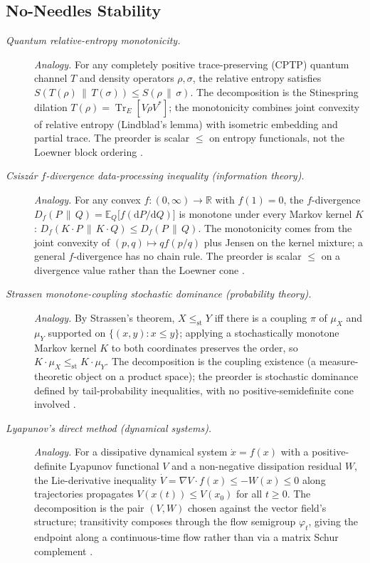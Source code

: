 \subsection*{ No-Needles Stability}
\begingroup\small
\begin{description}
\item[\emph{Quantum relative-entropy monotonicity.}] \textit{Analogy.}
For any completely positive trace-preserving (CPTP) quantum channel
\(T\) and density operators \(\rho,\sigma\), the relative entropy
satisfies \(S(T(\rho)\,\|\,T(\sigma))\le S(\rho\,\|\,\sigma)\).  The
decomposition is the Stinespring dilation
\(T(\rho)=\operatorname{Tr}_E[V\rho V^{*}]\); the monotonicity
combines joint convexity of relative entropy (Lindblad's lemma) with
isometric embedding and partial trace.  The preorder is scalar
\(\le\) on entropy functionals, not the Loewner block ordering
\citep{Lindblad1975CompletelyPositiveMaps}.

\item[\emph{Csiszár \(f\)-divergence data-processing inequality
(information theory).}] \textit{Analogy.}
For any convex \(f:(0,\infty)\to\mathbb R\) with \(f(1)=0\), the
\(f\)-divergence
\(D_f(P\,\|\,Q)=\mathbb E_Q\!\bigl[f(\mathrm dP/\mathrm dQ)\bigr]\) is
monotone under every Markov kernel \(K\):
\(D_f(K\!\cdot\!P\,\|\,K\!\cdot\!Q)\le D_f(P\,\|\,Q)\).  The
monotonicity comes from the joint convexity of
\((p,q)\mapsto qf(p/q)\) plus Jensen on the kernel mixture; a general
\(f\)-divergence has no chain rule.  The preorder is scalar \(\le\) on a
divergence value rather than the Loewner cone
\citep{LieseVajda2006Divergences}.

\item[\emph{Strassen monotone-coupling stochastic dominance
(probability theory).}] \textit{Analogy.}
By Strassen's theorem, \(X\le_{\mathrm{st}}Y\) iff there is a
coupling \(\pi\) of \(\mu_X\) and \(\mu_Y\) supported on
\(\{(x,y):x\le y\}\); applying a stochastically monotone Markov
kernel \(K\) to both coordinates preserves the order, so
\(K\!\cdot\!\mu_X\le_{\mathrm{st}}K\!\cdot\!\mu_Y\).  The
decomposition is the coupling existence (a measure-theoretic object
on a product space); the preorder is stochastic dominance defined by
tail-probability inequalities, with no positive-semidefinite cone
involved \citep{Strassen1965ExistenceProbabilityMeasures}.

\item[\emph{Lyapunov's direct method (dynamical systems).}] \textit{Analogy.}
For a dissipative dynamical system \(\dot x=f(x)\) with a
positive-definite Lyapunov functional \(V\) and a non-negative
dissipation
residual \(W\), the Lie-derivative inequality
\(\dot V=\nabla V\!\cdot\!f(x)\le-W(x)\le 0\) along trajectories
propagates \(V(x(t))\le V(x_0)\) for all \(t\ge 0\).  The
decomposition is the pair \((V,W)\) chosen against the vector field's
structure; transitivity composes through the flow semigroup
\(\varphi_t\), giving the  endpoint along a continuous-time
flow rather than via a matrix Schur complement
\citep{Lyapunov1892StabilityMotion}.
\end{description}
\endgroup

